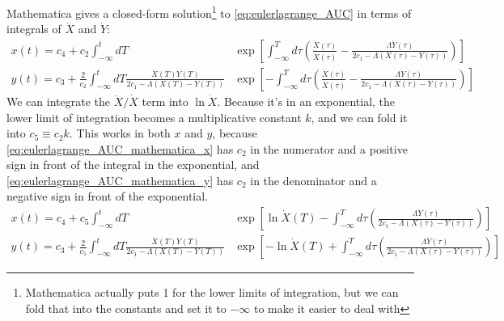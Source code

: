\documentclass[11pt]{article}
\newcommand{\Xdot}{\dot{X}}
\newcommand{\Ydot}{\dot{Y}}
\newcommand{\Xdotdot}{\ddot{X}}
\begin{document}
Mathematica gives a closed-form solution\footnote{Mathematica actually puts 1 for the lower limits of integration, but we can fold that into the constants and set it to \(-\infty\) to make it easier to deal with} to \cref{eq:eulerlagrange_AUC} in terms of integrals of \(\Xdot\) and \(\Ydot\):
\begin{align}
x(t)=c_4+c_2\int_{-\infty}^{t} dT &\exp\left[\int_{-\infty}^{T} d\tau \left(\frac{\Xdotdot(\tau)}{\Xdot(\tau)}-\frac{\Lambda\Ydot(\tau)}{2c_1-\Lambda (X(\tau)-Y(\tau))}\right) \right] \label{eq:eulerlagrange_AUC_mathematica_x} \\
y(t)=c_3+\frac{2}{c_2}\int_{-\infty}^{t} dT \frac{\Xdot(T)\Ydot(T)}{2c_1-\Lambda(X(T)-Y(T))} &\exp\left[ -\int_{-\infty}^{T} d\tau \left(\frac{\Xdotdot(\tau)}{\Xdot(\tau)}-\frac{\Lambda\Ydot(\tau)}{2c_1-\Lambda (X(\tau)-Y(\tau))}\right) \right] \label{eq:eulerlagrange_AUC_mathematica_y}
\end{align}
We can integrate the \(\Xdotdot/\Xdot\) term into \(\ln \Xdot\).  Because it's in an exponential, the lower limit of integration becomes a multiplicative constant \(k\), and we can fold it into \(c_5\equiv c_2k\).  This works in both \(x\) and \(y\), because \cref{eq:eulerlagrange_AUC_mathematica_x} has \(c_2\) in the numerator and a positive sign in front of the integral in the exponential, and \cref{eq:eulerlagrange_AUC_mathematica_y} has \(c_2\) in the denominator and a negative sign in front of the exponential.
\begin{align}
	x(t)=c_4+c_5\int_{-\infty}^{t} dT &\exp\left[\ln{\Xdot(T)}-\int_{-\infty}^{T} d\tau \left(\frac{\Lambda\Ydot(\tau)}{2c_1-\Lambda (X(\tau)-Y(\tau))}\right) \right] \label{eq:eulerlagrange_AUC_mathematica_x_simplify} \\
	y(t)=c_3+\frac{2}{c_5}\int_{-\infty}^{t} dT \frac{\Xdot(T)\Ydot(T)}{2c_1-\Lambda(X(T)-Y(T))} &\exp\left[ -\ln{\Xdot(T)}+\int_{-\infty}^{T} d\tau \left(\frac{\Lambda\Ydot(\tau)}{2c_1-\Lambda (X(\tau)-Y(\tau))}\right) \right] \label{eq:eulerlagrange_AUC_mathematica_y_simplify}
\end{align}
\end{document}

